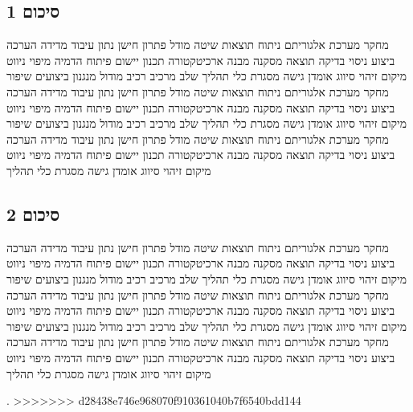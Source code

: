 \subsection{סיכום 1}
\label{sub:ch09_1}
מחקר מערכת אלגוריתם ניתוח תוצאות שיטה מודל פתרון חישן נתון עיבוד מדידה הערכה ביצוע ניסוי בדיקה תוצאה מסקנה מבנה ארכיטקטורה תכנון יישום פיתוח הדמיה מיפוי ניווט מיקום זיהוי סיווג אומדן גישה מסגרת כלי תהליך שלב מרכיב רכיב מודול מנגנון ביצועים שיפור מחקר מערכת אלגוריתם ניתוח תוצאות שיטה מודל פתרון חישן נתון עיבוד מדידה הערכה ביצוע ניסוי בדיקה תוצאה מסקנה מבנה ארכיטקטורה תכנון יישום פיתוח הדמיה מיפוי ניווט מיקום זיהוי סיווג אומדן גישה מסגרת כלי תהליך שלב מרכיב רכיב מודול מנגנון ביצועים שיפור מחקר מערכת אלגוריתם ניתוח תוצאות שיטה מודל פתרון חישן נתון עיבוד מדידה הערכה ביצוע ניסוי בדיקה תוצאה מסקנה מבנה ארכיטקטורה תכנון יישום פיתוח הדמיה מיפוי ניווט מיקום זיהוי סיווג אומדן גישה מסגרת כלי תהליך

\subsection{סיכום 2}
\label{sub:ch09_2}
מחקר מערכת אלגוריתם ניתוח תוצאות שיטה מודל פתרון חישן נתון עיבוד מדידה הערכה ביצוע ניסוי בדיקה תוצאה מסקנה מבנה ארכיטקטורה תכנון יישום פיתוח הדמיה מיפוי ניווט מיקום זיהוי סיווג אומדן גישה מסגרת כלי תהליך שלב מרכיב רכיב מודול מנגנון ביצועים שיפור מחקר מערכת אלגוריתם ניתוח תוצאות שיטה מודל פתרון חישן נתון עיבוד מדידה הערכה ביצוע ניסוי בדיקה תוצאה מסקנה מבנה ארכיטקטורה תכנון יישום פיתוח הדמיה מיפוי ניווט מיקום זיהוי סיווג אומדן גישה מסגרת כלי תהליך שלב מרכיב רכיב מודול מנגנון ביצועים שיפור מחקר מערכת אלגוריתם ניתוח תוצאות שיטה מודל פתרון חישן נתון עיבוד מדידה הערכה ביצוע ניסוי בדיקה תוצאה מסקנה מבנה ארכיטקטורה תכנון יישום פיתוח הדמיה מיפוי ניווט מיקום זיהוי סיווג אומדן גישה מסגרת כלי תהליך

 \cite{Thrun2005}.
>>>>>>> d28438e746e968070f910361040b7f6540bdd144
